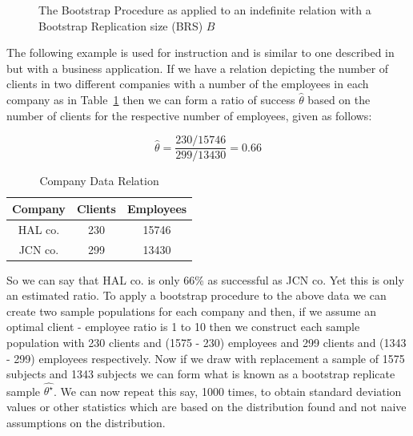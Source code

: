 \begin{figure}[ht]
\centerline{}
\caption{\label{rev:bootstrap} The Bootstrap Procedure as applied to an
indefinite relation with a Bootstrap Replication size (BRS) $B$}
\end{figure}

The following example is used for instruction and is similar
to one described in \cite{et93} but with a business 
application.
If we have a relation depicting the number of clients in 
two different companies with a number of the employees in
each company as in Table~\ref{table:3.01} then we can form a ratio of
success $\hat{\theta}$ based on the number of clients 
for the respective number of employees, given as follows:

\begin{displaymath}
\hat{\theta} = \frac{230 / 15746}{299 / 13430} = 0.66
\end{displaymath}

{\line
\begin{table}[ht]
\begin{center}
\begin{tabular}{|c|c|c|} \hline
Company & Clients & Employees \\ \hline
HAL co.	& 230		& 15746 \\
JCN co. & 299 		& 13430 \\ \hline
\end{tabular}
\end{center}
\caption{\label{table:3.01} Company Data Relation}
\end{table}
}

So we can say that HAL co. is only 66\% as successful as JCN co. Yet
this is only an estimated ratio. To apply a bootstrap procedure to
the above data we can create two sample populations for each
company and then, if we assume an optimal client - employee ratio is
1 to 10 then we construct each sample population with 230 clients and
(1575 - 230) employees and 299 clients and (1343 - 299) employees respectively.
Now if we draw with replacement a sample of 1575 subjects and 1343 subjects
we can form what is known as a bootstrap replicate sample
$\hat{\theta^\star}$. We can now repeat this say, 1000 times, to
obtain standard deviation values or other statistics which are based
on the distribution found and not naive assumptions on the distribution.

